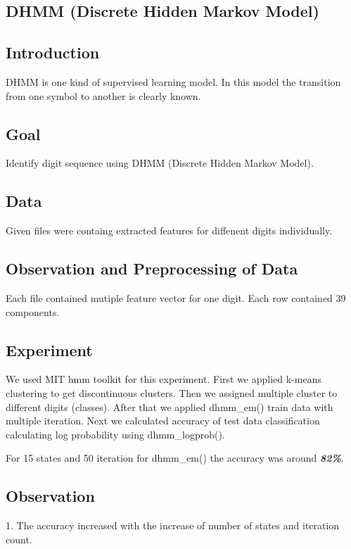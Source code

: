 \begin{center}
\section{DHMM (Discrete Hidden Markov Model)}
\end{center}

\subsection{Introduction}
\begin{flushleft}
  DHMM is one kind of supervised learning model. In this model the transition from one symbol to 
  another is clearly known.
\end{flushleft}

\subsection{Goal}
\begin{flushleft}
    Identify digit sequence using DHMM (Discrete Hidden Markov Model).
\end{flushleft}

\subsection{Data}
\begin{flushleft}
  Given files were containg extracted features for diffenent digits individually. 
\end{flushleft}

\subsection{Observation and Preprocessing of Data}
\begin{flushleft}
  Each file contained mutiple feature vector for one digit. Each row contained 39 components.
\end{flushleft}

\subsection{Experiment}
\begin{flushleft}
  We used MIT hmm toolkit for this experiment. 
  First we applied k-means clustering to get discontinuous clusters.
  Then we assigned multiple cluster to different digits (classes).
  After that we applied dhmm\_em() train data with multiple iteration.
  Next we calculated accuracy of test data classification calculating log probability using dhmm\_logprob().

  For 15 states and 50 iteration for dhmm\_em() the accuracy was around \textbf{\textit{82\%}}. \break
\end{flushleft}

\subsection{Observation}
\begin{flushleft}
  1. The accuracy increased with the increase of number of states and iteration count.
\end{flushleft}
